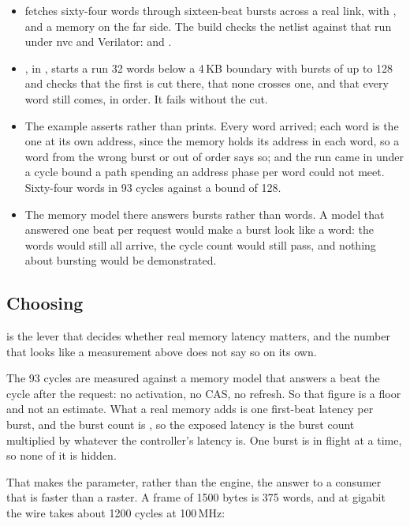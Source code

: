 \begin{itemize}
\item {} fetches sixty-four words through sixteen-beat
bursts across a real link, with ,  and a
memory on the far side. The build checks the netlist against that run
under nvc and Verilator:
 and
.
\item {}, in
, starts a run 32 words below a 4\,KB
boundary with bursts of up to 128 and checks that the first is cut
there, that none crosses one, and that every word still comes, in
order. It fails without the cut.
\item The example asserts rather than prints. Every word arrived;
each word is the one at its own address, since the memory holds its
address in each word, so a word from the wrong burst or out of order
says so; and the run came in under a cycle bound a path spending an
address phase per word could not meet. Sixty-four words in 93 cycles
against a bound of 128.
\item The memory model there answers bursts rather than words. A
model that answered one beat per request would make a burst look like
a word: the words would still all arrive, the cycle count would still
pass, and nothing about bursting would be demonstrated.
\end{itemize}

\subsection*{Choosing }

 is the lever that decides whether real memory latency
matters, and the number that looks like a measurement above does not
say so on its own.

The 93 cycles are measured against a memory model that answers a beat
the cycle after the request: no activation, no CAS, no refresh. So
that figure is a floor and not an estimate. What a real memory adds is
one first-beat latency per burst, and the burst count is
, so the exposed latency is the burst count
multiplied by whatever the controller's latency is. One burst is in
flight at a time, so none of it is hidden.

That makes the parameter, rather than the engine, the answer to a
consumer that is faster than a raster. A frame of 1500 bytes is 375
words, and at gigabit the wire takes about 1200 cycles at 100\,MHz:

